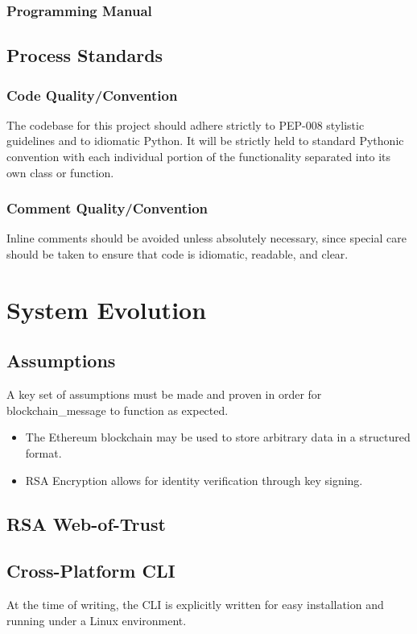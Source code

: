 \documentclass[titlepage]{report}
\begin{document}
\subsubsection{Programming Manual}

\subsection{Process Standards}
\subsubsection{Code Quality/Convention}
The codebase for this project should adhere strictly to PEP-008 stylistic guidelines and to idiomatic Python. It will be strictly held to standard Pythonic convention with each individual portion of the functionality separated into its own class or function.

\subsubsection{Comment Quality/Convention}
Inline comments should be avoided unless absolutely necessary, since special care should be taken to ensure that code is idiomatic, readable, and clear.

\section{System Evolution}
\subsection{Assumptions}
A key set of assumptions must be made and proven in order for blockchain\_message to function as expected.
\begin{itemize}
\item The Ethereum blockchain may be used to store arbitrary data in a structured format.
\item RSA Encryption allows for identity verification through key signing.
\end{itemize}

\subsection{RSA Web-of-Trust}

\subsection{Cross-Platform CLI}
At the time of writing, the CLI is explicitly written for easy installation and running under a Linux environment.
\end{document}

